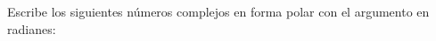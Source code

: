 \documentclass[addpoints,spanish, 12pt,a4paper]{exam}
\begin{document}
\begin{questions}
\begin{multicols}{1}
        \end{multicols}
        \question Escribe los siguientes números complejos en forma polar con el argumento en radianes:
        \begin{multicols}{1} 
        \end{multicols}
        
    \end{questions}
    
\end{document}
